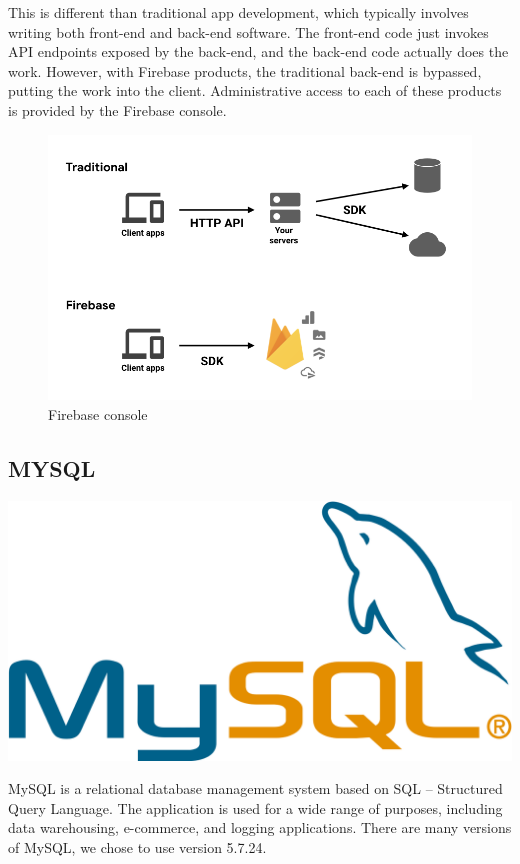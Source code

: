 \documentclass[a4paper,12pt]{report}
\begin{document}
This is different than traditional app development, which typically involves writing both front-end and back-end software. The front-end code just invokes API endpoints exposed by the back-end, and the back-end code actually does the work. However, with Firebase products, the traditional back-end is bypassed, putting the work into the client. Administrative access to each of these products is provided by the Firebase console.
\begin{figure}[h]
    \begin{center}
    \includegraphics[scale=.5]{images/firebaseDiagram.png}
    \caption{Firebase console}
    \label{fig:firbase}
    \end{center}
\end{figure}

\subsection{MYSQL}
\includegraphics[scale=.04]{images/mysql.png}

MySQL is a relational database management system based on SQL – Structured Query Language. The application is used for a wide range of purposes, including data warehousing, e-commerce, and logging applications. There are many versions of MySQL, we chose to use version 5.7.24.
\end{document}
